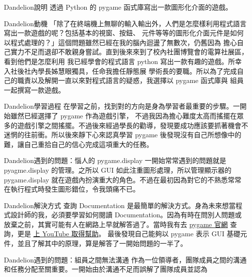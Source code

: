 \documentclass{article}
\begin{document}

\begin{large}
\begin{boxpar}{Dandelion}{說明}
透過 Python 的 pygame 函式庫寫出一款圖形化介面的遊戲。
\end{boxpar}
\begin{boxpar}{Dandelion}{動機}
「除了在終端機上無聊的輸入輸出外，人們是怎麼樣利用程式語言寫出一款遊戲的呢？包括基本的視窗、按鈕、
    元件等等的圖形化介面元件是如何以程式處理的？」這個問題雖然已經在我的腦內迴盪了無數次，仍舊因為
    擔心自己實力不足而退卻不敢親身嘗試。直到後來來到了校內社團博覽會的電算社展區，看到他們是怎麼利用
    我已經學會的程式語言 python 寫出一款有趣的遊戲。所幸入社後社內學長姊慧眼獨具，任命我擔任靜態展
    學術長的要職。所以為了完成自己的職責以及解開一直以來對程式語言的疑惑，我選擇以 pygame 函式庫與
    組員一起撰寫一款遊戲。
\end{boxpar}
    \begin{boxpar}{Dandelion}{學習過程}
        在學習之前，找到對的方向是身為學習者最重要的步驟。一開始雖然已經選擇了 pygame 作為遊戲引擎，
        不過我因為擔心難度太高而搖擺在眾多的遊戲引擎之間搖擺。不過後來經過學長的勸導，發現要成功應該要抓著機會不迷惘的往前衝。所以後來靜下心來認真學習
        pygame 後發現沒有自己所想像中的難，讓自己重拾自己的信心完成這項重大的任務。
    \end{boxpar}
\begin{boxpar}{Dandelion}{遇到的問題：惱人的 pygame.display}
一開始常常遇到的問題就是 pyagme.display 的管理。之所以 GUI
    如此注重圖形處理，所以管理顯示器的 pygame.display
    就在遊戲內扮演重大的角色。不過在最初因為對它的不熟悉常常在執行程式時發生圖形錯位，令我頭痛不已。
    \begin{boxpar}{Dandelion}{解決方式}
        查詢 Documentation 是最簡單的解決方式。身為未來想當程式設計師的我，必須要學習如何閱讀
        Documentation。因為有時在問別人問題或放棄之前，其實可能有人在網路上早就解答過了。當時我有去
        \href{https://www.pygame.org/docs/ref/display.html}{pygame 官網} 查詢，更是
        \href{https://www.youtube.com/watch?v=C8YtdC8mxTU}{上 YouTube 取得幫助}。
        最後發現自己能夠以 pygame 表示 GUI 基礎元件，並且了解其中的原理，算是解答了一開始問題的一半了。
    \end{boxpar}
\end{boxpar}
\begin{boxpar}{Dandelion}{遇到的問題：組員之間無法溝通}
    作為一位領導者，團隊成員之間的溝通和任務分配至關重要。一開始由於溝通不足而誤解了團隊成員並認為

\end{boxpar}
\end{large}
\end{document}
